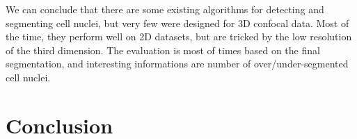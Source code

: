 We can conclude that there are some existing algorithms for detecting and segmenting cell nuclei,
but very few were designed for 3D confocal data.
Most of the time, they perform well on 2D datasets, but are tricked by the low resolution of the third dimension.
The evaluation is most of times based on the final segmentation, and interesting informations are number of over/under-segmented cell nuclei.






\section*{Conclusion}


%
%





